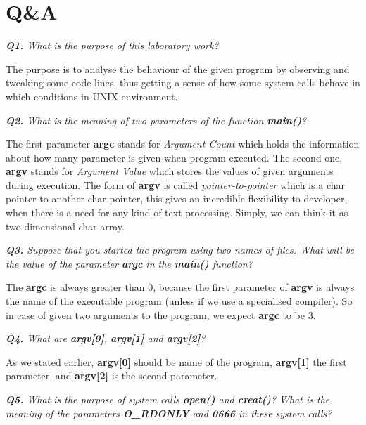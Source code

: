 \documentclass[11pt]{article}
\begin{document}
\section*{Q\&A}

\textit{\textbf{Q1.} What is the purpose of this laboratory work?}
\vspace{3mm}

The purpose is to analyse the behaviour of the given program by observing and tweaking some code lines, thus getting a sense of how some system calls behave in which conditions in UNIX environment.

\vspace{3mm}
\textit{\textbf{Q2.} What is the meaning of two parameters of the function \textbf{main()}?}
\vspace{3mm}

The first parameter \textbf{argc} stands for \textit{Argument Count} which holds the information about how many parameter is given when program executed. The second one, \textbf{argv} stands for \textit{Argument Value} which stores the values of given arguments during execution. The form of \textbf{argv} is called \textit{pointer-to-pointer} which is a char pointer to another char pointer, this gives an incredible flexibility to developer, when there is a need for any kind of text processing. Simply, we can think it as two-dimensional char array.

\vspace{3mm}
\textit{\textbf{Q3.} Suppose that you started the program using two names of files. What will be the value of the parameter \textbf{argc} in the \textbf{main()} function?}
\vspace{3mm}

The \textbf{argc} is always greater than 0, because the first parameter of \textbf{argv} is always the name of the executable program (unless if we use a specialised compiler). So in case of given two arguments to the program, we expect \textbf{argc} to be 3.

\vspace{5mm}
\textit{\textbf{Q4.} What are \textbf{argv[0]}, \textbf{argv[1]} and \textbf{argv[2]}?}
\vspace{5mm}

As we stated earlier, \textbf{argv[0]} should be name of the program, \textbf{argv[1]} the first parameter, and \textbf{argv[2]} is the second parameter. 

\vspace{5mm}
\textit{\textbf{Q5.} What is the purpose of system calls \textbf{open()} and \textbf{creat()}? What is the meaning of the parameters \textbf{O\_RDONLY} and \textbf{0666} in these system calls?}
\vspace{5mm}
\end{document}
